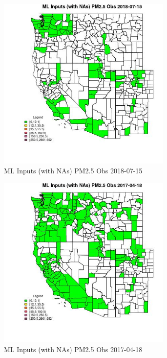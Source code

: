 \begin{figure} 
\centering  
\includegraphics[width=0.77\textwidth]{Code_Outputs/Report_ML_input_PM25_Step4_part_e_de_duplicated_aves_compiled_2019-05-21wNAs_CountyPM25_ObsMean2018-07-15.jpg} 
\caption{\label{fig:Report_ML_input_PM25_Step4_part_e_de_duplicated_aves_compiled_2019-05-21wNAsCountyPM25_ObsMean2018-07-15}ML Inputs (with NAs) PM2.5 Obs 2018-07-15} 
\end{figure} 
 

\begin{figure} 
\centering  
\includegraphics[width=0.77\textwidth]{Code_Outputs/Report_ML_input_PM25_Step4_part_e_de_duplicated_aves_compiled_2019-05-21wNAs_CountyPM25_ObsMean2017-04-18.jpg} 
\caption{\label{fig:Report_ML_input_PM25_Step4_part_e_de_duplicated_aves_compiled_2019-05-21wNAsCountyPM25_ObsMean2017-04-18}ML Inputs (with NAs) PM2.5 Obs 2017-04-18} 
\end{figure} 
 

